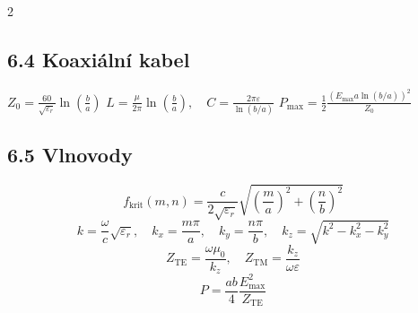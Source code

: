 \documentclass[10pt]{article}
\begin{document}
\begin{multicols}{2}
\subsection*{6.4 Koaxiální kabel}
$Z_0 = \frac{60}{\sqrt{\varepsilon_r}} \ln\left( \frac{b}{a} \right)$  
$L = \frac{\mu}{2\pi} \ln\left( \frac{b}{a} \right), \quad C = \frac{2\pi\varepsilon}{\ln(b/a)}$  
$P_{\mathrm{max}} = \frac{1}{2} \frac{(E_{\mathrm{max}} a \ln(b/a))^2}{Z_0}$

\subsection*{6.5 Vlnovody}
$$f_{\mathrm{krit}}(m,n) = \frac{c}{2 \sqrt{\varepsilon_r}} \sqrt{\left( \frac{m}{a} \right)^2 + \left( \frac{n}{b} \right)^2}$$  
$$k = \frac{\omega}{c} \sqrt{\varepsilon_r}, \quad k_x = \frac{m\pi}{a}, \quad k_y = \frac{n\pi}{b}, \quad k_z = \sqrt{k^2 - k_x^2 - k_y^2}$$  
$$Z_{\mathrm{TE}} = \frac{\omega\mu_0}{k_z}, \quad Z_{\mathrm{TM}} = \frac{k_z}{\omega\varepsilon}$$  
$$P = \frac{ab}{4} \frac{E_{\mathrm{max}}^2}{Z_{\mathrm{TE}}}$$

\end{multicols}

\endgroup
\end{document}
